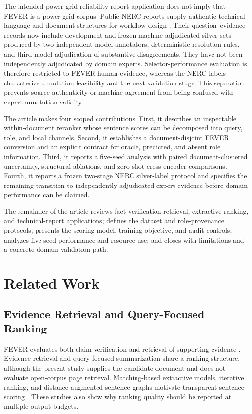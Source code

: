 \documentclass[applsci,article,submit,moreauthors]{Definitions/mdpi}
\begin{document}
The intended power-grid reliability-report application does not imply that FEVER is a power-grid corpus. Public NERC reports supply authentic technical language and document structures for workflow design \cite{nercEventAnalysis,nerc2015qualityreport}. Their question--evidence records now include development and frozen machine-adjudicated silver sets produced by two independent model annotators, deterministic resolution rules, and third-model adjudication of substantive disagreements. They have not been independently adjudicated by domain experts. Selector-performance evaluation is therefore restricted to FEVER human evidence, whereas the NERC labels characterize annotation feasibility and the next validation stage. This separation prevents source authenticity or machine agreement from being confused with expert annotation validity.

The article makes four scoped contributions. First, it describes an inspectable within-document reranker whose sentence scores can be decomposed into query, role, and local channels. Second, it establishes a document-disjoint FEVER conversion and an explicit contract for oracle, predicted, and absent role information. Third, it reports a five-seed analysis with paired document-clustered uncertainty, structural ablations, and zero-shot cross-encoder comparisons. Fourth, it reports a frozen two-stage NERC silver-label protocol and specifies the remaining transition to independently adjudicated expert evidence before domain performance can be claimed.

The remainder of the article reviews fact-verification retrieval, extractive ranking, and technical-report applications; defines the dataset and role-provenance protocols; presents the scoring model, training objective, and audit controls; analyzes five-seed performance and resource use; and closes with limitations and a concrete domain-validation path.

\section{Related Work}
\subsection{Evidence Retrieval and Query-Focused Ranking}
FEVER evaluates both claim verification and retrieval of supporting evidence \cite{thorne2018fever}. Evidence retrieval and query-focused summarization share a ranking structure, although the present study supplies the candidate document and does not evaluate open-corpus page retrieval. Matching-based extractive models, iterative ranking, and distance-augmented sentence graphs motivate transparent sentence scoring \cite{zhong2020extractive,bi2021aredsum,liu2021unsupervised}. These studies also show why ranking quality should be reported at multiple output budgets.
\end{document}
